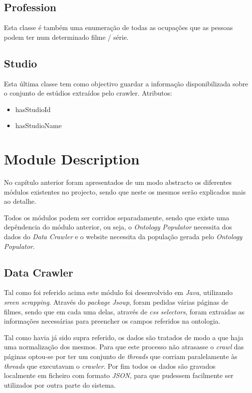 \documentclass[a4paper]{article}
\begin{document}
\subsection{Profession}
\indent \indent Esta classe é também uma enumeração de todas as ocupações que as pessoas podem ter num determinado filme / série.

\subsection{Studio}
\indent \indent Esta última classe tem como objectivo guardar a informação disponibilizada sobre o conjunto de estúdios extraídos pelo crawler.
Atributos:
\begin{itemize}
	\item hasStudioId
	\item hasStudioName
\end{itemize}

\section{Module Description}
\indent \indent No capítulo anterior foram apresentados de um modo abstracto os diferentes módulos existentes no projecto, sendo que neste os mesmos serão explicados mais ao detalhe.

Todos os módulos podem ser corridos separadamente, sendo que existe uma depêndencia do módulo anterior, ou seja, o \textit{Ontology Populator} necessita dos dados do \textit{Data Crawler} e o website necessita da população gerada pelo \textit{Ontology Populator}.

\subsection{Data Crawler}
\indent \indent Tal como foi referido acima este módulo foi desenvolvido em \textit{Java}, utilizando \textit{sreen scrapping}. Através do \textit{package} \textit{Jsoup}, foram pedidas várias páginas de filmes, sendo que em cada uma delas, através de \textit{css selectors}, foram extraidas as informações necessárias para preencher os campos referidos na ontologia.

Tal como havia já sido supra referido, os dados são tratados de modo a que haja uma normalização dos mesmos. Para que este processo não atrasasse o \textit{crawl} das páginas optou-se por ter um conjunto de \textit{threads} que corriam paralelamente às \textit{threads} que executavam o \textit{crawler}. Por fim todos os dados são gravados localmente em ficheiro com formato \textit{JSON}, para que pudessem facilmente ser utilizados por outra parte do sistema.
\end{document}
